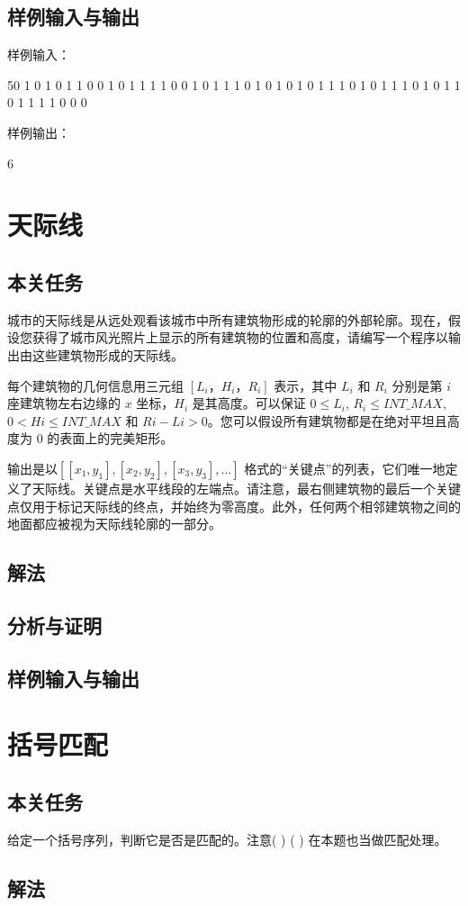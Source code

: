\documentclass[UTF8,a4paperdui, %
]{ctexart}
\begin{document}
\subsection{样例输入与输出}
样例输入：

50 1 0 1 0 1 1 0 0 1 0 1 1 1 1 0 0 1 0 1 1 1 0 1 0 1 0 1 0 1 1 1 0 1 0 1 1 1 0 1 0 1 1 0 1 1 1 1 0 0 0

样例输出：

6
\section{天际线}
\subsection{本关任务}
城市的天际线是从远处观看该城市中所有建筑物形成的轮廓的外部轮廓。现在，假设您获得了城市风光照片上显示的所有建筑物的位置和高度，请编写一个程序以输出由这些建筑物形成的天际线。

每个建筑物的几何信息用三元组 $[L_i，H_i，R_i]$ 表示，其中 $L_i$ 和 $R_i$ 分别是第 $i$ 座建筑物左右边缘的 $x$ 坐标，$H_i$ 是其高度。可以保证 $0 \leq L_i$, $R_i \leq INT\_MAX$, $0 < Hi \leq INT\_MAX$ 和 $Ri - Li > 0$。您可以假设所有建筑物都是在绝对平坦且高度为 0 的表面上的完美矩形。

输出是以$[[x_1,y_1],[x_2, y_2],[x_3, y_3], ... ]$ 格式的“关键点”的列表，它们唯一地定义了天际线。关键点是水平线段的左端点。请注意，最右侧建筑物的最后一个关键点仅用于标记天际线的终点，并始终为零高度。此外，任何两个相邻建筑物之间的地面都应被视为天际线轮廓的一部分。
\subsection{解法}
\subsection{分析与证明}
\subsection{样例输入与输出}
\section{括号匹配}
\subsection{本关任务}
给定一个括号序列，判断它是否是匹配的。注意( ) ( ) 在本题也当做匹配处理。
\subsection{解法}
\end{document}
